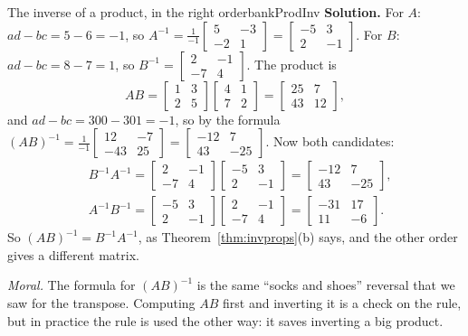 \documentclass[11pt]{article}
\begin{document}
\begin{exmp}{The inverse of a product, in the right order}{bankProdInv}
\textbf{Solution.} For $A$: $ad-bc=5-6=-1$, so $A^{-1}=\frac1{-1}\begin{bmatrix}5&-3\\-2&1\end{bmatrix}=\begin{bmatrix}-5&3\\2&-1\end{bmatrix}$. For $B$: $ad-bc=8-7=1$, so $B^{-1}=\begin{bmatrix}2&-1\\-7&4\end{bmatrix}$. The product is
\[
AB=\begin{bmatrix}1&3\\2&5\end{bmatrix}\begin{bmatrix}4&1\\7&2\end{bmatrix}=\begin{bmatrix}25&7\\43&12\end{bmatrix},
\]
and $ad-bc=300-301=-1$, so by the formula $(AB)^{-1}=\frac1{-1}\begin{bmatrix}12&-7\\-43&25\end{bmatrix}=\begin{bmatrix}-12&7\\43&-25\end{bmatrix}$. Now both candidates:
\begin{align*}
&B^{-1}A^{-1}=\begin{bmatrix}2&-1\\-7&4\end{bmatrix}\begin{bmatrix}-5&3\\2&-1\end{bmatrix}=\begin{bmatrix}-12&7\\43&-25\end{bmatrix},\\
&A^{-1}B^{-1}=\begin{bmatrix}-5&3\\2&-1\end{bmatrix}\begin{bmatrix}2&-1\\-7&4\end{bmatrix}=\begin{bmatrix}-31&17\\11&-6\end{bmatrix}.
\end{align*}
So $(AB)^{-1}=B^{-1}A^{-1}$, as Theorem~\ref{thm:invprops}(b) says, and the other order gives a different matrix.

\emph{Moral.} The formula for $(AB)^{-1}$ is the same ``socks and shoes'' reversal that we saw for the transpose. Computing $AB$ first and inverting it is a check on the rule, but in practice the rule is used the other way: it saves inverting a big product.
\end{exmp}
\end{document}

